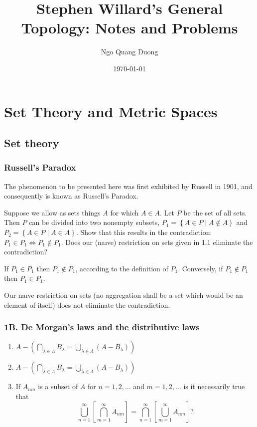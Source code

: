 \documentclass[12pt,oneside]{book}
\title{Stephen Willard's General Topology: Notes and Problems}
\author{Ngo Quang Duong}
\date{\today}
\theoremstyle{definition}
\begin{document}
\maketitle

\tableofcontents

\chapter{Set Theory and Metric Spaces}

\section{Set theory}

\subsection{Russell's Paradox}

The phenomenon to be presented here was first exhibited by Russell in 1901, and consequently is known as Russell's Paradox.

Suppose we allow as sets things \(A\) for which \( A \in A \). Let \( P \) be the set of all sets. Then \( P \) can be divided into two nonempty subsets, \( P_{1} = \left\{ A \in P \mid A \notin A \right\} \) and \( P_{2} = \left\{ A \in P \mid A \in A \right\} \). Show that this results in the contradiction: \( P_{1} \in P_{1} \iff P_{1} \notin P_{1} \). Does our (na{\i}ve) restriction on sets given in 1.1 eliminate the contradiction?

\hrulefill%

If \( P_{1} \in P_{1} \) then \( P_{1} \notin P_{1} \), according to the definition of \( P_{1} \). Conversely, if \( P_{1} \notin P_{1} \) then \( P_{1} \in P_{1} \).

Our na{\i}ve restriction on sets (no aggregation shall be a set which would be an element of itself) does not eliminate the contradiction.

\subsection*{1B. De Morgan's laws and the distributive laws}

\begin{enumerate}[itemsep=0pt]
    \item \( A - \left( \bigcap_{\lambda \in \Lambda} B_{\lambda} = \bigcup_{\lambda \in \Lambda} (A - B_{\lambda}) \right) \)
    \item \( A - \left( \bigcap_{\lambda \in \Lambda} B_{\lambda} = \bigcup_{\lambda \in \Lambda} (A - B_{\lambda}) \right) \)
    \item If \( A_{nm} \) is a subset of \( A \) for \( n = 1, 2, \ldots \) and \( m = 1, 2, \ldots \) is it necessarily true that
    \[
        \bigcup_{n=1}^{\infty} \left\lbrack \bigcap_{m=1}^{\infty} A_{nm} \right\rbrack = \bigcap_{n=1}^{\infty} \left\lbrack \bigcup_{m=1}^{\infty} A_{nm} \right\rbrack?
    \]
\end{enumerate}
\end{document}
